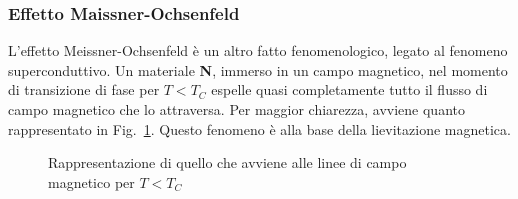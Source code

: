 \subsubsection{Effetto Maissner-Ochsenfeld}
L'effetto Meissner-Ochsenfeld \`e un altro fatto fenomenologico, legato al fenomeno superconduttivo. Un materiale \textbf{N}, immerso in un campo magnetico, nel momento di transizione di fase per $T<T_C$ espelle quasi completamente tutto il flusso di campo magnetico che lo attraversa. Per maggior chiarezza, avviene quanto rappresentato in Fig.~\ref{MEIS:FIG}. Questo fenomeno \`e alla base della lievitazione magnetica.
\begin{figure}
	\centering
	\caption{Rappresentazione di quello che avviene alle linee di campo magnetico per $T<T_C$}
	\label{MEIS:FIG}
\end{figure}

